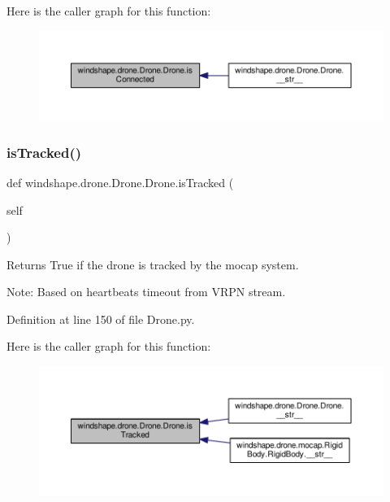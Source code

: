 Here is the caller graph for this function\+:\nopagebreak
\begin{figure}[H]
\begin{center}
\leavevmode
\includegraphics[width=350pt]{classwindshape_1_1drone_1_1_drone_1_1_drone_a0d6c9c56fd735733f4a2268896c30d37_icgraph}
\end{center}
\end{figure}
\mbox{\label{classwindshape_1_1drone_1_1_drone_1_1_drone_a8e5d50aa9df5f17650570e60ac809477}} 
\subsubsection{\texorpdfstring{is\+Tracked()}{isTracked()}}
{\footnotesize\ttfamily def windshape.\+drone.\+Drone.\+Drone.\+is\+Tracked (\begin{DoxyParamCaption}\item[{}]{self }\end{DoxyParamCaption})}

\begin{DoxyVerb}Returns True if the drone is tracked by the mocap system.

Note:
    Based on heartbeats timeout from VRPN stream.
\end{DoxyVerb}
 

Definition at line 150 of file Drone.\+py.

Here is the caller graph for this function\+:\nopagebreak
\begin{figure}[H]
\begin{center}
\leavevmode
\includegraphics[width=350pt]{classwindshape_1_1drone_1_1_drone_1_1_drone_a8e5d50aa9df5f17650570e60ac809477_icgraph}
\end{center}
\end{figure}
\mbox{\label{classwindshape_1_1drone_1_1_drone_1_1_drone_ab98bca80eada4b3365774f3cc347ea9b}} 
